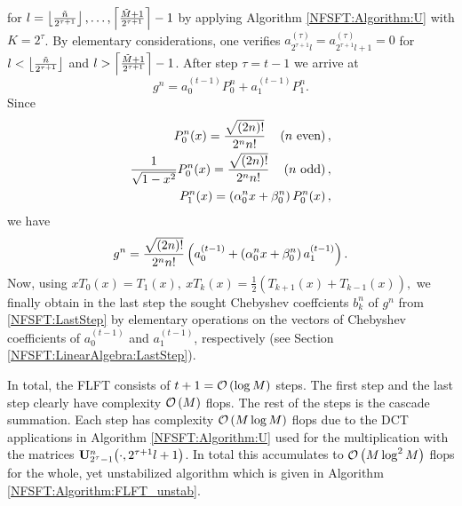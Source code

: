 for $l=\left\lfloor\frac{\tilde{n}}{2^{\tau+1}}\right\rfloor,\ldots,\left\lceil\frac{\tilde{M}+1}{2^{\tau+1}}\right\rceil-1$
by applying Algorithm \ref{NFSFT:Algorithm:U} with $K=2^{\tau}$. By elementary considerations, one verifies
$a_{2^{\tau+1}l}^{(\tau)} = a_{2^{\tau+1}l+1}^{(\tau)} = 0$ for $l < \left\lfloor\frac{\tilde{n}}{2^{\tau+1}}\right\rfloor$ and 
$l > \left\lceil\frac{\tilde{M}+1}{2^{\tau+1}}\right\rceil-1$.
After step $\tau = t-1$ we arrive at
\begin{equation}
  \nonumber
  g^n = a_{0}^{(t-1)} P_{0}^{n} + a_{1}^{(t-1)} P_{1}^{n}.
\end{equation}
Since 
\begin{align}
  \nonumber
  P_{0}^n{\hspace{-0.4ex}}\left(x\right) = \frac{\sqrt{(2n)!}}{2^n n!} \quad \left(\text{$n$ even}\right),\\
  \nonumber
  \frac{1}{\sqrt{1-x^2}}P_{0}^n{\hspace{-0.4ex}}\left(x\right) = \frac{\sqrt{(2n)!}}{2^n n!} \quad \left(\text{$n$ odd}\right),\\
  P_{1}^n{\hspace{-0.4ex}}\left(x\right) = \left(\alpha_{0}^nx + \beta_{0}^n\right)P_{0}^n{\hspace{-0.4ex}}\left(x\right),
\end{align} 
we have
\begin{equation}
  \label{NFSFT:LastStep}
  g^n = \frac{\sqrt{(2n)!}}{2^n n!} \left(a_{0}^{(t-1)} + 
  \left(\alpha_{0}^nx + \beta_{0}^n\right) a_{1}^{(t-1)}\right).
\end{equation}
Now, using 
$%
  xT_{0}(x) = T_{1}(x),\ xT_{k}(x) = \frac{1}{2}\left( T_{k+1}(x) + T_{k-1}(x) \right),
$ %
we finally obtain in the last step the sought Chebyshev coeffcients $b_{k}^n$ of $g^n$ 
from \eqref{NFSFT:LastStep} by
elementary operations on the vectors of Chebyshev coefficients of $a_{0}^{(t-1)}$ and $a_{1}^{(t-1)}$, respectively 
(see Section \ref{NFSFT:LinearAlgebra:LastStep}).

In total, the FLFT consists of $t+1 = \mathcal{O}\left(\log M\right)$ steps. The first step and the last step clearly have complexity $\mathcal{O}\left(M\right)$ flops. The rest of the steps is the cascade summation. Each step has complexity $\mathcal{O}\left(M \log M\right)$ flops due to the DCT applications in Algorithm \ref{NFSFT:Algorithm:U} used for the multiplication with the matrices ${\mathbf{U}_{2^{\tau}-1}^{n}{\hspace{-0.4ex}}\left(\cdot,2^{\tau+1}l+1\right)}$. In total this accumulates to $\mathcal{O}\left(M \log^2 M\right)$ flops for the whole, yet unstabilized algorithm which is given in Algorithm 
\ref{NFSFT:Algorithm:FLFT_unstab}.

